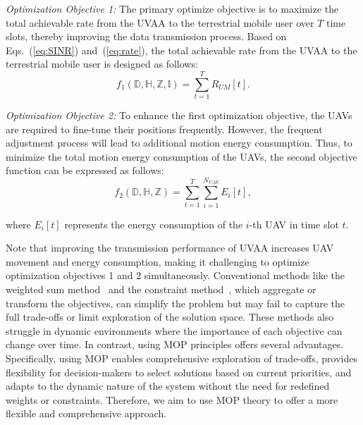 \documentclass[10pt,journal,compsoc]{IEEEtran}
\begin{document}
\par \emph{Optimization Objective 1:} The primary optimize objective is to maximize the total achievable rate from the UVAA to the terrestrial mobile user over $T$ time slots, thereby improving the data transmission process. Based on Eqs.~(\ref{eq:SINR}) and~(\ref{eq:rate}), the total achievable rate from the UVAA to the terrestrial mobile user is designed as follows:
\begin{equation}
\label{eq:objective_1}
    f_1 \left( \mathbb{D}, \mathbb{H}, \mathbb{Z}, \mathbb{I} \right) = \sum_{t=1}^T R_{UM}[t].
\end{equation}

\par \emph{Optimization Objective 2:} To enhance the first optimization objective, the UAVs are required to fine-tune their positions frequently. However, the frequent adjustment process will lead to additional motion energy consumption. Thus, to minimize the total motion energy consumption of the UAVs, the second objective function can be expressed as follows:
\begin{equation}
    f_2 \left( \mathbb{D}, \mathbb{H}, \mathbb{Z}\right) = \sum_{t=1}^{T} \sum_{i=1}^{N_{UAV}} E_{i}[t],
\end{equation}

\noindent where $E_i[t]$ represents the energy consumption of the $i$-th UAV in time slot $t$.

\par Note that improving the transmission performance of UVAA increases UAV movement and energy consumption, making it challenging to optimize optimization objectives 1 and 2 simultaneously. Conventional methods like the weighted sum method~\cite{Wang2018} and the constraint method~\cite{pirouz2016computational}, which aggregate or transform the objectives, can simplify the problem but may fail to capture the full trade-offs or limit exploration of the solution space. These methods also struggle in dynamic environments where the importance of each objective can change over time. In contrast, using MOP principles offers several advantages. Specifically, using MOP enables comprehensive exploration of trade-offs, provides flexibility for decision-makers to select solutions based on current priorities, and adapts to the dynamic nature of the system without the need for redefined weights or constraints. Therefore, we aim to use MOP theory to offer a more flexible and comprehensive approach.
\end{document}
